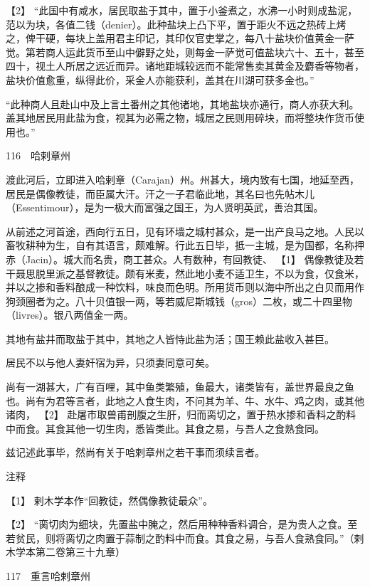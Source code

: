 \documentclass[12pt,UTF8]{ctexbook}
\begin{document}
【2】 “此国中有咸水，居民取盐于其中，置于小釜煮之，水沸一小时则成盐泥，范以为块，各值二钱（denier）。此种盐块上凸下平，置于距火不远之热砖上烤之，俾干硬，每块上盖用君主印记，其印仅官吏掌之，每八十盐块价值黄金一萨觉。第若商人运此货币至山中僻野之处，则每金一萨觉可值盐块六十、五十，甚至四十，视土人所居之远近而异。诸地距城较远而不能常售卖其黄金及麝香等物者，盐块价值愈重，纵得此价，采金人亦能获利，盖其在川湖可获多金也。”

“此种商人且赴山中及上言土番州之其他诸地，其地盐块亦通行，商人亦获大利。盖其地居民用此盐为食，视其为必需之物，城居之民则用碎块，而将整块作货币使用也。”





116　哈剌章州

渡此河后，立即进入哈剌章（Carajan）州。州甚大，境内致有七国，地延至西，居民是偶像教徒，而臣属大汗。汗之一子君临此地，其名曰也先帖木儿（Essentimour），是为一极大而富强之国王，为人贤明英武，善治其国。

从前述之河首途，西向行五日，见有环墙之城村甚众，是一出产良马之地。人民以畜牧耕种为生，自有其语言，颇难解。行此五日毕，抵一主城，是为国都，名称押赤（Jacin）。城大而名贵，商工甚众。人有数种，有回教徒、 【1】 偶像教徒及若干聂思脱里派之基督教徒。颇有米麦，然此地小麦不适卫生，不以为食，仅食米，并以之掺和香料酿成一种饮料，味良而色明。所用货币则以海中所出之白贝而用作狗颈圈者为之。八十贝值银一两，等若威尼斯城钱（gros）二枚，或二十四里物（livres）。银八两值金一两。

其地有盐井而取盐于其中，其地之人皆恃此盐为活；国王赖此盐收入甚巨。

居民不以与他人妻奸宿为异，只须妻同意可矣。

尚有一湖甚大，广有百哩，其中鱼类繁殖，鱼最大，诸类皆有，盖世界最良之鱼也。尚有为君等言者，此地之人食生肉，不问其为羊、牛、水牛、鸡之肉，或其他诸肉， 【2】 赴屠市取兽甫剖腹之生肝，归而脔切之，置于热水掺和香料之酌料中而食。其食其他一切生肉，悉皆类此。其食之易，与吾人之食熟食同。

兹记述此事毕，然尚有关于哈剌章州之若干事而须续言者。

注释

【1】 剌木学本作“回教徒，然偶像教徒最众”。

【2】 “脔切肉为细块，先置盐中腌之，然后用种种香料调合，是为贵人之食。至若贫民，则将脔切之肉置于蒜制之酌料中而食。其食之易，与吾人食熟食同。”（剌木学本第二卷第三十九章）





117　重言哈剌章州
\end{document}
